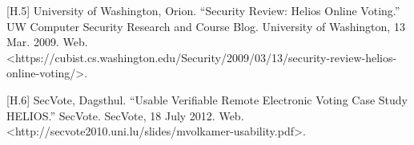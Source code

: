 [H.5] University of Washington, Orion. ``Security Review: Helios Online Voting.'' UW Computer Security Research and Course Blog. University of Washington, 13 Mar. 2009. Web. {\textless}https://cubist.cs.washington.edu/Security/2009/03/13/security-review-helios-online-voting/{\textgreater}.

[H.6] SecVote, Dagsthul. ``Usable Verifiable Remote Electronic Voting Case Study HELIOS.'' SecVote. SecVote, 18 July 2012. Web. {\textless}http://secvote2010.uni.lu/slides/mvolkamer-usability.pdf{\textgreater}.

